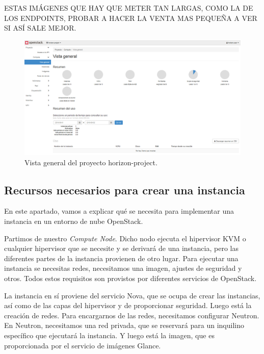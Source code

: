 \begin{tcolorbox}[colback=red!5!red,colframe=red!75!black]
ESTAS IMÁGENES QUE HAY QUE METER TAN LARGAS, COMO LA DE LOS ENDPOINTS, PROBAR A HACER LA VENTA MAS PEQUEÑA A VER SI ASÍ SALE MEJOR.
\end{tcolorbox}

\begin{figure}
    \centering
    \includegraphics[width=1\textwidth]{imagenes/capitulo6/acceso-horizon-user.PNG}
    \caption{Vista general del proyecto horizon-project.}
	\vspace{0.3cm}
    \label{acceso-horizon-user}
\end{figure}

\subsection{Recursos necesarios para crear una instancia}
En este apartado, vamos a explicar qué se necesita para implementar una instancia en un entorno de nube OpenStack.

Partimos de nuestro \textit{Compute Node}. Dicho nodo ejecuta el hipervisor KVM o cualquier hipervisor que se necesite y se derivará de una instancia, pero las diferentes partes de la instancia provienen de otro lugar. Para ejecutar una instancia se necesitas redes, necesitamos una imagen, ajustes de seguridad y otros. Todos estos requisitos son provistos por diferentes servicios de OpenStack.

La instancia en sí proviene del servicio Nova, que se ocupa de crear las instancias, así como de las capas del hipervisor y de proporcionar seguridad. Luego está la creación de redes. Para encargarnos de las redes, necesitamos configurar Neutron. En Neutron, necesitamos una red privada, que se reservará para un inquilino específico que ejecutará la instancia. Y luego está la imagen, que es proporcionada por el servicio de imágenes Glance.

